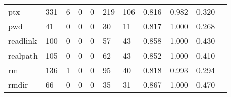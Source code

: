 \begin{longtable}{lp{1.2cm}p{1.2cm}p{1.2cm}p{1.2cm}p{1.2cm}p{1.2cm}p{1.2cm}p{1.2cm}p{1.2cm}p{1.2cm}}
ptx       &                                   331 &                                                  6 &                                                  0 &                                                  0 &                                                219 &                                                106 &                                         0.816 &                                              0.982 &                                              0.320 \\
pwd       &                                    41 &                                                  0 &                                                  0 &                                                  0 &                                                 30 &                                                 11 &                                         0.817 &                                              1.000 &                                              0.268 \\
readlink  &                                   100 &                                                  0 &                                                  0 &                                                  0 &                                                 57 &                                                 43 &                                         0.858 &                                              1.000 &                                              0.430 \\
realpath  &                                   105 &                                                  0 &                                                  0 &                                                  0 &                                                 62 &                                                 43 &                                         0.852 &                                              1.000 &                                              0.410 \\
rm        &                                   136 &                                                  1 &                                                  0 &                                                  0 &                                                 95 &                                                 40 &                                         0.818 &                                              0.993 &                                              0.294 \\
rmdir     &                                    66 &                                                  0 &                                                  0 &                                                  0 &                                                 35 &                                                 31 &                                         0.867 &                                              1.000 &                                              0.470 \\

\end{longtable}

